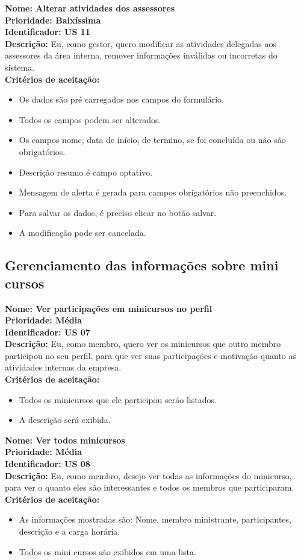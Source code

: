 \begin{anexosenv}
\indent \textbf{Nome: Alterar atividades dos assessores\\
\indent Prioridade: Baixíssima\\
\indent Identificador: US 11\\
\indent Descrição:} Eu, como gestor, quero modificar as atividades delegadas aos assessores da área interna, remover informações inválidas ou incorretas do sistema.\\
\indent \textbf{Critérios de aceitação:}
\begin{itemize}
    \item Os dados são pré carregados nos campos do formulário.
    \item Todos os campos podem ser alterados.
    \item Os campos nome, data de início, de termino, se foi concluída ou não são obrigatórios.
    \item Descrição resumo é campo optativo.
    \item Mensagem de alerta é gerada para campos obrigatórios não preenchidos.
    \item Para salvar os dados, é preciso clicar no botão salvar.
    \item A modificação pode ser cancelada.
\end{itemize}

\subsection{Gerenciamento das informações sobre mini cursos}

\indent \textbf{Nome: Ver participações em minicursos no perfil\\
\indent Prioridade: Média\\
\indent Identificador: US 07\\
\indent Descrição:} Eu, como membro, quero ver os minicursos que outro membro participou no seu perfil, para que ver suas participações e motivação quanto as atividades internas da empresa.\\
\indent \textbf{Critérios de aceitação:}
\begin{itemize}
    \item Todos os minicursos que ele participou serão listados.
    \item A descrição será exibida.
\end{itemize}

\indent \textbf{Nome: Ver todos minicursos\\
\indent Prioridade: Média\\
\indent Identificador: US 08\\
\indent Descrição:} Eu, como membro, desejo ver todas as informações do minicurso, para ver o quanto eles são interessantes e todos os membros que participaram.\\
\indent \textbf{Critérios de aceitação:}
\begin{itemize}
    \item As informações mostradas são: Nome, membro ministrante, participantes, descrição e a carga horária.
    \item Todos os mini cursos são exibidos em uma lista.
\end{itemize}


\end{anexosenv}
